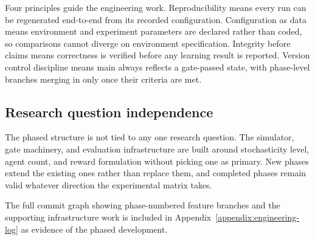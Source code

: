 Four principles guide the engineering work. Reproducibility means every run can be regenerated end-to-end from its recorded configuration. Configuration as data means environment and experiment parameters are declared rather than coded, so comparisons cannot diverge on environment specification. Integrity before claims means correctness is verified before any learning result is reported. Version control discipline means main always reflects a gate-passed state, with phase-level branches merging in only once their criteria are met.

\subsection{Research question independence}

The phased structure is not tied to any one research question. The simulator, gate machinery, and evaluation infrastructure are built around stochasticity level, agent count, and reward formulation without picking one as primary. New phases extend the existing ones rather than replace them, and completed phases remain valid whatever direction the experimental matrix takes.

The full commit graph showing phase-numbered feature branches and the supporting infrastructure work is included in Appendix~\ref{appendix:engineering-log} as evidence of the phased development.